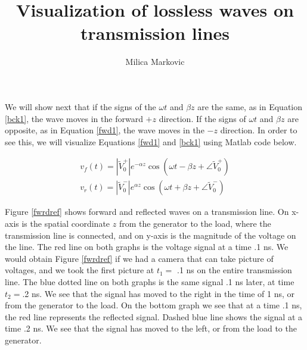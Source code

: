 \documentclass{ximera}
\title{Visualization of lossless waves on transmission lines}
\author{Milica Markovic}
\begin{document}
  
\begin{abstract}  

\end{abstract}  
\maketitle    



\begin{example}

We will show next that if  the signs of the $\omega t$ and
$\beta z$ are the same, as in Equation \ref{bck1}, the wave moves in the forward $+z$
direction. If the signs of $\omega t$ and $\beta z$ are opposite, as in Equation \ref{fwd1}, the
wave moves in the $-z$ direction. In order to see this, we will visualize Equations \ref{fwd1} and \ref{bck1} using Matlab code below.

\begin{eqnarray}
v_f(t)=|\tilde{V}_0^+| e^{ - \alpha z} \cos(\omega t - \beta z + \angle \tilde{V}_0^+) \label{fwd1} \\
v_r(t)= |\tilde{V}_0^-|e^{\alpha z} \cos(\omega t + \beta z + \angle \tilde{V}_0^-) \label{bck1}
\end{eqnarray}


Figure \ref{fwrdref}  shows forward and reflected waves on a transmission line. On x-axis is the spatial coordinate $z$ from the generator to the load, where the transmission line is connected,  and on y-axis is   the magnitude of the voltage on the line.   The red line on both graphs is the voltage signal at a time  .1 ns. We would obtain  Figure \ref{fwrdref} if we had a camera that can take picture of voltages, and we took the first picture at $t_1=$ .1 ns on the entire transmission line.  The blue dotted line on both graphs is the same signal .1 ns later,  at time $t_2=$.2  ns.  We see that the signal has moved to the right in the time of 1 ns, or from the generator to the load.  On the bottom graph we see that at a time .1 ns, the red line represents the  reflected signal.  Dashed blue line shows the signal  at a time .2 ns. We see  that  the signal has moved to the left, or  from the load to the generator. 



\end{example}
\end{document}
